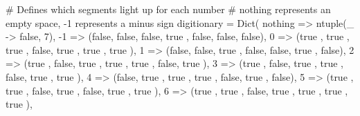 \documentclass[
  letterpaper,
  DIV=11,
  numbers=noendperiod]{scrreprt}
\newenvironment{Shaded}{\begin{snugshade}}{\end{snugshade}}
\newcommand{\CommentTok}[1]{\textcolor[rgb]{0.37,0.37,0.37}{#1}}
\newcommand{\ConstantTok}[1]{\textcolor[rgb]{0.56,0.35,0.01}{#1}}
\newcommand{\FloatTok}[1]{\textcolor[rgb]{0.68,0.00,0.00}{#1}}
\newcommand{\FunctionTok}[1]{\textcolor[rgb]{0.28,0.35,0.67}{#1}}
\newcommand{\NormalTok}[1]{\textcolor[rgb]{0.00,0.23,0.31}{#1}}
\newcommand{\OperatorTok}[1]{\textcolor[rgb]{0.37,0.37,0.37}{#1}}
\begin{document}
\begin{Shaded}
\begin{Highlighting}[]
\CommentTok{\# Defines which segments light up for each number}
\CommentTok{\# nothing represents an empty space, {-}1 represents a minus sign}
\NormalTok{digitionary }\OperatorTok{=} \FunctionTok{Dict}\NormalTok{(}
    \ConstantTok{nothing} \OperatorTok{=\textgreater{}} \FunctionTok{ntuple}\NormalTok{(\_ }\OperatorTok{{-}\textgreater{}} \ConstantTok{false}\NormalTok{, }\FloatTok{7}\NormalTok{),}
    \OperatorTok{{-}}\FloatTok{1} \OperatorTok{=\textgreater{}}\NormalTok{ (}\ConstantTok{false}\NormalTok{, }\ConstantTok{false}\NormalTok{, }\ConstantTok{false}\NormalTok{, }\ConstantTok{true}\NormalTok{ , }\ConstantTok{false}\NormalTok{, }\ConstantTok{false}\NormalTok{, }\ConstantTok{false}\NormalTok{),}
    \FloatTok{0}  \OperatorTok{=\textgreater{}}\NormalTok{ (}\ConstantTok{true}\NormalTok{ , }\ConstantTok{true}\NormalTok{ , }\ConstantTok{true}\NormalTok{ , }\ConstantTok{false}\NormalTok{, }\ConstantTok{true}\NormalTok{ , }\ConstantTok{true}\NormalTok{ , }\ConstantTok{true}\NormalTok{ ),}
    \FloatTok{1}  \OperatorTok{=\textgreater{}}\NormalTok{ (}\ConstantTok{false}\NormalTok{, }\ConstantTok{false}\NormalTok{, }\ConstantTok{true}\NormalTok{ , }\ConstantTok{false}\NormalTok{, }\ConstantTok{false}\NormalTok{, }\ConstantTok{true}\NormalTok{ , }\ConstantTok{false}\NormalTok{),}
    \FloatTok{2}  \OperatorTok{=\textgreater{}}\NormalTok{ (}\ConstantTok{true}\NormalTok{ , }\ConstantTok{false}\NormalTok{, }\ConstantTok{true}\NormalTok{ , }\ConstantTok{true}\NormalTok{ , }\ConstantTok{true}\NormalTok{ , }\ConstantTok{false}\NormalTok{, }\ConstantTok{true}\NormalTok{ ),}
    \FloatTok{3}  \OperatorTok{=\textgreater{}}\NormalTok{ (}\ConstantTok{true}\NormalTok{ , }\ConstantTok{false}\NormalTok{, }\ConstantTok{true}\NormalTok{ , }\ConstantTok{true}\NormalTok{ , }\ConstantTok{false}\NormalTok{, }\ConstantTok{true}\NormalTok{ , }\ConstantTok{true}\NormalTok{ ),}
    \FloatTok{4}  \OperatorTok{=\textgreater{}}\NormalTok{ (}\ConstantTok{false}\NormalTok{, }\ConstantTok{true}\NormalTok{ , }\ConstantTok{true}\NormalTok{ , }\ConstantTok{true}\NormalTok{ , }\ConstantTok{false}\NormalTok{, }\ConstantTok{true}\NormalTok{ , }\ConstantTok{false}\NormalTok{),}
    \FloatTok{5}  \OperatorTok{=\textgreater{}}\NormalTok{ (}\ConstantTok{true}\NormalTok{ , }\ConstantTok{true}\NormalTok{ , }\ConstantTok{false}\NormalTok{, }\ConstantTok{true}\NormalTok{ , }\ConstantTok{false}\NormalTok{, }\ConstantTok{true}\NormalTok{ , }\ConstantTok{true}\NormalTok{ ),}
    \FloatTok{6}  \OperatorTok{=\textgreater{}}\NormalTok{ (}\ConstantTok{true}\NormalTok{ , }\ConstantTok{true}\NormalTok{ , }\ConstantTok{false}\NormalTok{, }\ConstantTok{true}\NormalTok{ , }\ConstantTok{true}\NormalTok{ , }\ConstantTok{true}\NormalTok{ , }\ConstantTok{true}\NormalTok{ ),}

\end{Highlighting}
\end{Shaded}
\end{document}
